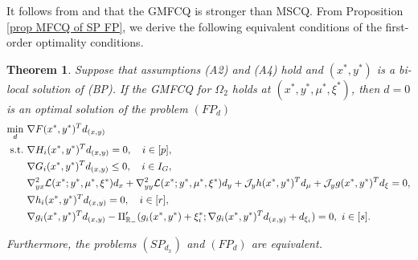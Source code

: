 \documentclass[11pt]{article}
\newtheorem{theorem}{Theorem}[section]
\theoremstyle{definition}
\theoremstyle{remark}
\newtheorem{remark}[theorem]{Remark}
\numberwithin{equation}{section}
\begin{document}
It follows from  \cite[Theorem 4.2]{Hiriart-Urruty} and \cite[Corollary 5 of Theorem 6.5.2]{Clarke} that the GMFCQ is stronger than MSCQ.
From Proposition \ref{prop MFCQ of SP FP}, we derive the following equivalent conditions of the  first-order optimality conditions.
\begin{theorem}\label{thm FONC for FP}
 Suppose that assumptions \textnormal{(A2)} and \textnormal{(A4)} hold and $(x^*,y^*)$ is a bi-local solution of (BP). If the GMFCQ for $\Omega_2$ holds at $(x^*,y^*,\mu^*,\xi^*)$,
   then $d=0$ is an optimal solution of the problem  $(FP_{d})$
       \begin{subequations}\label{linearied cone FP}
         \begin{align}
         \label{linearied FP'}
   \min_{d}  ~& \nabla F(x^*, y^*)^{T} d_{(x,y)}\\
   \label{linearied FP b}
   {\rm s.t.}~&\nabla H_i(x^*, y^*)^{T} d_{(x,y)} = 0, \quad  i\in[p],  \\
   \label{linearied FP c}
 &\nabla G_i(x^*, y^*)^{T} d_{(x,y)}  \leq 0,\quad  i \in I_{G},\\
\label{linearied FP d}
        &\nabla_{yx}^2 \mathcal{L}(x^*;y^*,\mu^*,\xi^*)d_x+\nabla_{yy}^2 \mathcal{L}(x^*;y^*,\mu^*,\xi^*)d_y
        +\mathcal{J}_y h(x^*,y^*)^Td_{\mu}+\mathcal{J}_yg(x^*,y^*)^Td_{\xi}=0, \\
\label{linearied FP e}
        &   \nabla h_i(x^*,y^*)^Td_{(x,y)}=0, \quad  i\in[r],  \\
  \label{linearied FP f}
  &\nabla g_i(x^*,y^*)^Td_{(x,y)}-\Pi_{\mathbb{R}_{-}}'(g_i(x^*,y^*)+\xi_i^*;\nabla
             g_i(x^*,y^*)^Td_{(x,y)}+d_{\xi_i})=0,~i\in[s].
   \end{align}
       \end{subequations}

 Furthermore, the problems $(SP_{d_x})$ and $(FP_{d})$ are equivalent.
\end{theorem}
\end{document}
